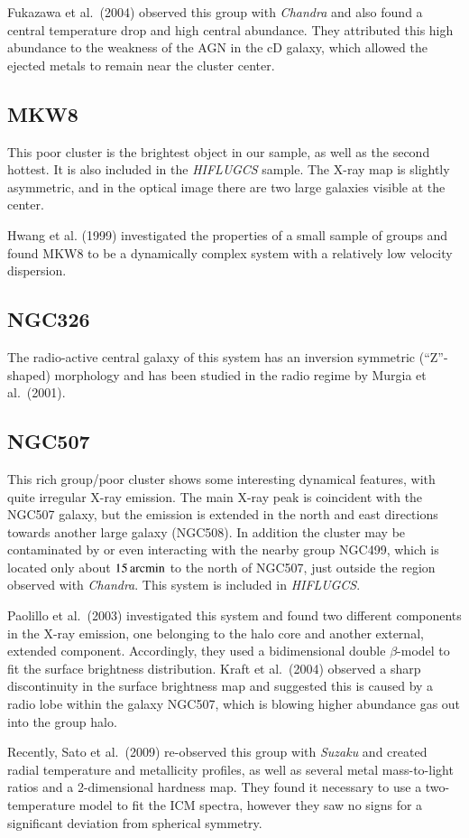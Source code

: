 \documentclass[structabstract]{aa}
\begin{document}
Fukazawa et al.\ (2004) observed this group with \emph{Chandra} and also found
a central temperature drop and high central abundance. They attributed this
high abundance to the weakness of the AGN in the cD galaxy, which
allowed the ejected metals to remain near the cluster center.
\subsection*{MKW8}
This poor cluster is the brightest object in our sample, as well as the second
hottest. It is also included in the \emph{HIFLUGCS} sample. The X-ray map is
slightly asymmetric, and in the optical image there are two large galaxies
visible at the center.

Hwang et al. (1999) investigated the properties of a
small sample of groups and found MKW8 to be a dynamically complex system with
a relatively low velocity dispersion.
\subsection*{NGC326}
The radio-active central galaxy of this system has an inversion
symmetric (``Z''-shaped) morphology and has been studied in the radio regime
by Murgia et al.\ (2001).
\subsection*{NGC507}
This rich group/poor cluster shows some interesting dynamical features, with
quite irregular X-ray emission. The main X-ray peak is coincident with the
NGC507 galaxy, but the emission is extended in the north and east directions
towards another large galaxy (NGC508). In addition the cluster may be
contaminated by or even interacting with the nearby group NGC499, which is
located only about $\unit[15]{arcmin}$ to the north of NGC507, just outside
the region observed with \emph{Chandra}. This system is included in
\emph{HIFLUGCS}.

Paolillo et al.\ (2003) investigated this system and found two different
components in the X-ray emission, one belonging to the halo core and another
external, extended component. Accordingly, they used a bidimensional double
$\beta$-model to fit the surface brightness distribution. Kraft et al.\ (2004)
observed a sharp discontinuity in the surface brightness map and suggested this
is caused by a radio lobe within the galaxy NGC507, which is blowing higher
abundance gas out into the group halo.

Recently, Sato et al.\ (2009) re-observed this group with \emph{Suzaku} and
created radial temperature and metallicity profiles, as well as several metal
mass-to-light ratios and a 2-dimensional hardness map. They found it necessary
to use a two-temperature model to fit the ICM spectra, however they saw no
signs for a significant deviation from spherical symmetry.
\end{document}
